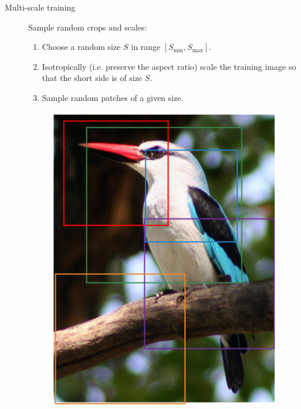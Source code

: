 \begin{description}
    \item[Multi-scale training] 
        Sample random crops and scales:

        \begin{minipage}{0.7\linewidth}
            \begin{enumerate}
                \item Choose a random size $S$ in range $[S_{\min}, S_{\max}]$.
                \item Isotropically (i.e. preserve the aspect ratio) scale the training image so that the short side is of size $S$.
                \item Sample random patches of a given size.
            \end{enumerate}
        \end{minipage}
        \begin{minipage}{0.2\linewidth}
            \begin{figure}[H]
                \centering
                \includegraphics[width=0.9\linewidth]{./img/multi_scale_augmentation.png}
            \end{figure}
        \end{minipage}


\end{description}
